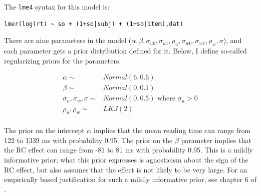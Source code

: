 \documentclass{ar-1col}\usepackage[]{graphicx}\usepackage[]{color}
\begin{document}
The \texttt{lme4} syntax for this model is:

\begin{verbatim}
lmer(log(rt) ~ so + (1+so|subj) + (1+so|item),dat)
\end{verbatim}

There are nine parameters in the model ($\alpha, \beta, \sigma_{u0}, \sigma_{u1}, \rho_u, \sigma_{w0}, \sigma_{w1}, \rho_w,\sigma$), and each parameter gets a prior distribution defined for it. Below, I define so-called regularizing priors for the parameters. 
\begin{marginnote}[]
\end{marginnote}


\begin{align*}
\alpha \sim& Normal(6,0.6)\\
\beta \sim& Normal(0,0.1)\\
\sigma_u, \sigma_w, \sigma \sim& Normal(0,0.5) \text{ where } \sigma_u>0\\
\rho_u, \rho_w \sim&  LKJ(2)\\
\end{align*}

The prior on the intercept $\alpha$ implies that the mean reading time can range from 122 to 1339 ms with probability 0.95. The prior on the  $\beta$ parameter implies that the RC effect can range from -81 to 81 ms with probability 0.95. This is a mildly informative prior; what this prior expresses is agnosticism about the sign of the RC effect, but also assumes that the effect is not likely to be very large. For an empirically based justification for such a mildly informative prior, see chapter 6 of \citet{NicenboimEtAlBayes2019}.
\end{document}
